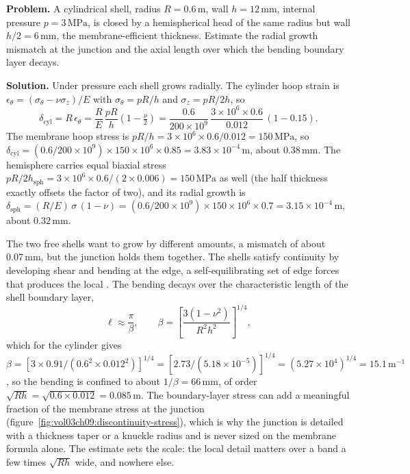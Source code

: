 \textbf{Problem.} A cylindrical shell, radius $R = 0.6\,\si{\meter}$,
wall $h = 12\,\si{\milli\meter}$, internal pressure $p = 3\,\text{MPa}$,
is closed by a hemispherical head of the same radius but wall $h/2 =
6\,\si{\milli\meter}$, the membrane-efficient thickness. Estimate the
radial growth mismatch at the junction and the axial length over which
the bending boundary layer decays.

\textbf{Solution.} Under pressure each shell grows radially. The
cylinder hoop strain is $\epsilon_\theta = (\sigma_\theta - \nu
\sigma_z)/E$ with $\sigma_\theta = pR/h$ and $\sigma_z = pR/2h$, so
\[
\delta_{\text{cyl}} = R\,\epsilon_\theta = \frac{R}{E}\,
\frac{pR}{h}\left(1 - \tfrac{\nu}{2}\right)
= \frac{0.6}{200\times 10^9}\,\frac{3\times 10^6\times 0.6}{0.012}\,
(1 - 0.15).
\]
The membrane hoop stress is $pR/h = 3\times 10^6\times 0.6/0.012 =
150\,\text{MPa}$, so $\delta_{\text{cyl}} = (0.6/200\times 10^9)\times
150\times 10^6\times 0.85 = 3.83\times 10^{-4}\,\text{m}$, about
$0.38\,\si{\milli\meter}$. The hemisphere carries equal biaxial stress
$pR/2h_{\text{sph}} = 3\times 10^6\times 0.6/(2\times 0.006) = 150\,
\text{MPa}$ as well (the half thickness exactly offsets the factor of
two), and its radial growth is $\delta_{\text{sph}} = (R/E)\,\sigma\,
(1-\nu) = (0.6/200\times 10^9)\times 150\times 10^6\times 0.7 = 3.15
\times 10^{-4}\,\text{m}$, about $0.32\,\si{\milli\meter}$.

The two free shells want to grow by different amounts, a mismatch of
about $0.07\,\si{\milli\meter}$, but the junction holds them together.
The shells satisfy continuity by developing shear and bending at the
edge, a self-equilibrating set of edge forces that produces the local
. The bending decays over the
characteristic length of the shell boundary layer,
\[
\ell \approx \frac{\pi}{\beta}, \qquad
\beta = \left[\frac{3(1-\nu^2)}{R^2 h^2}\right]^{1/4},
\]
which for the cylinder gives $\beta = [3\times 0.91/(0.6^2\times
0.012^2)]^{1/4} = [2.73/(5.18\times 10^{-5})]^{1/4} = (5.27\times
10^4)^{1/4} = 15.1\,\text{m}^{-1}$, so the bending is confined to about
$1/\beta = 66\,\si{\milli\meter}$, of order $\sqrt{R h} = \sqrt{0.6
\times 0.012} = 0.085\,\si{\meter}$. The boundary-layer stress can add
a meaningful fraction of the membrane stress at the junction
(figure~\ref{fig:vol03ch09:discontinuity-stress}), which is why the
junction is detailed with a thickness taper or a knuckle radius and is
never sized on the membrane formula alone. The estimate sets the scale:
the local detail matters over a band a few times $\sqrt{R h}$ wide, and
nowhere else.

